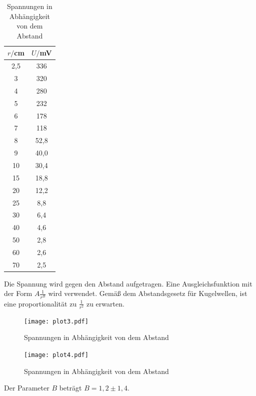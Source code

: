 \begin{table}[H]
  \centering
  \caption{Spannungen in Abhängigkeit von dem Abstand}
  \label{tab:Phase}
  \begin{tabular}{c c}
    \toprule
    $r/$cm  &  $U/$mV \\
    \midrule
     2,5   &    336    \\
     3     &    320    \\
     4     &    280    \\
     5     &    232    \\
     6     &    178    \\
     7     &    118    \\
     8     &    52,8    \\
     9     &    40,0    \\
    10     &    30,4    \\
    15     &    18,8    \\
    20     &    12,2    \\
    25     &    8,8     \\
    30     &    6,4     \\
    40     &    4,6     \\
    50     &    2,8     \\
    60     &    2,6     \\
    70     &    2,5     \\
    \bottomrule
  \end{tabular}
\end{table}

Die Spannung wird gegen den Abstand aufgetragen. Eine Ausgleichsfunktion mit der Form $A \frac{1}{r^B}$ wird verwendet. Gemäß dem
Abstandsgesetz für Kugelwellen, ist eine proportionalität zu $\frac{1}{r^2}$ zu erwarten.

\begin{figure}[H]
  \centering
  \texttt{[image: plot3.pdf]}
  \caption{Spannungen in Abhängigkeit von dem Abstand}
  \label{fig:plot3}
\end{figure}

\begin{figure}[H]
  \centering
  \texttt{[image: plot4.pdf]}
  \caption{Spannungen in Abhängigkeit von dem Abstand}
  \label{fig:plot4}
\end{figure}

Der Parameter $B$ beträgt $B= 1,2 \pm 1,4$.
